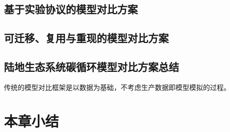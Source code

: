 \subsection{基于实验协议的模型对比方案}

\subsection{可迁移、复用与重现的模型对比方案}

\subsection{陆地生态系统碳循环模型对比方案总结}

传统的模型对比框架是以数据为基础，不考虑生产数据即模型模拟的过程。

\section{本章小结}